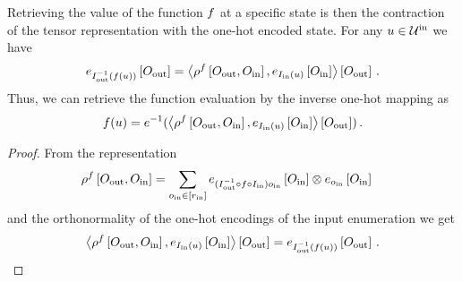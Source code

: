 \begin{theorem}
    \label{the:basisCalculus}
    Retrieving the value of the function $f$ at a specific state is then the contraction of the tensor representation with the one-hot encoded state.
    For any $u\in\mathcal{U}^{\mathrm{in}}$ we have
    \begin{align*}
        e_{I_{\mathrm{out}}^{-1}(f(u))}\left[O_{\mathrm{out}}\right]
        = \left\langle 
            \rho^{f}\left[O_{\mathrm{out}},O_{\mathrm{in}}\right],
            e_{I_{\mathrm{in}}(u)}\left[O_{\mathrm{in}}\right]
        \right\rangle \left[ O_{\mathrm{out}} \right] \, .
    \end{align*}
    Thus, we can retrieve the function evaluation by the inverse one-hot mapping as
    \begin{align*}
        f(u) = e^{-1}(\left\langle 
            \rho^{f}\left[O_{\mathrm{out}},O_{\mathrm{in}}\right],
            e_{I_{\mathrm{in}}(u)}\left[O_{\mathrm{in}}\right]
        \right\rangle \left[ O_{\mathrm{out}} \right]) \, .
    \end{align*}
\end{theorem}
\begin{proof}
    From the representation
    \begin{align*}
        \rho^{f}\left[O_{\mathrm{out}},O_{\mathrm{in}}\right]
        & =  \sum_{o_{\mathrm{in}}\in[r_{\mathrm{in}}]}
        e_{(I_{\mathrm{out}}^{-1} \circ f \circ I_{\mathrm{in}}) o_{\mathrm{in}}
        }\left[O_{\mathrm{in}}\right]
        \otimes
        e_{o_{\mathrm{in}}}\left[O_{\mathrm{in}}\right]
    \end{align*}
    and the orthonormality of the one-hot encodings of the input enumeration we get
    \begin{align*}
        \left\langle 
            \rho^{f}\left[O_{\mathrm{out}},O_{\mathrm{in}}\right],
            e_{I_{\mathrm{in}}(u)}\left[O_{\mathrm{in}}\right]
        \right\rangle \left[ O_{\mathrm{out}} \right]
        = e_{I_{\mathrm{out}}^{-1}(f(u))}\left[O_{\mathrm{out}}\right] \, .
    \end{align*}
\end{proof}

